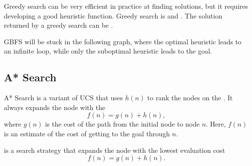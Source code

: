 Greedy search can be very efficient in practice at finding solutions, but it requires developing a good heuristic function. Greedy search is  and . The solution returned by a greedy search can be .

\begin{example}
    GBFS will be stuck in the following graph, where the optimal heuristic leads to an infinite loop, while only the suboptimal heuristic leads to the goal.

\end{example}

\subsection{A* Search}

A* Search is a variant of UCS that uses $h(n)$ to rank the nodes on the \Frontier. It always expands the node with the  \[ f(n) = g(n) + h(n), \] where $g(n)$ is the cost of the path from the initial node to node $n$. Here, $f(n)$ is an estimate of the cost of getting to the goal through $n$.

\begin{definition}[A* Search]\label{def:astar}
     is a search strategy that expands the node with the lowest evaluation cost \[ f(n) = g(n) + h(n). \]
\end{definition}